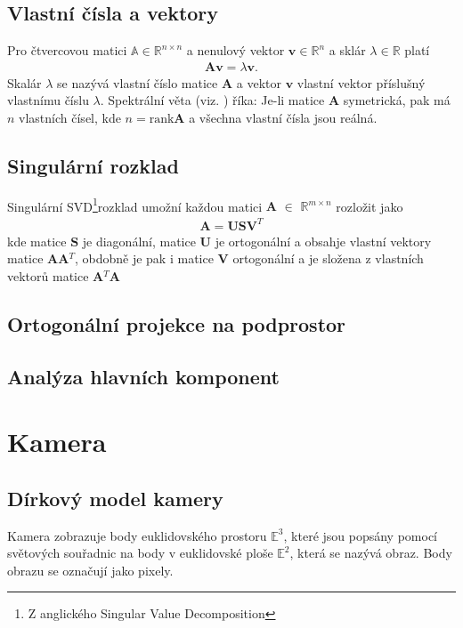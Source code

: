 \documentclass[twoside]{ctuthesis}
\newcommand{\spc}[2]{$\mathbb{#1}^{#2}$}
\newcommand{\minsp}[3]{$\mathbb{#1} \in \mathbb{#2}^{#3}$}
\newcommand{\tl}[1]{$\mathbf{#1}$}
\begin{document}
\section{Vlastní čísla a vektory}
Pro čtvercovou matici \minsp{A}{R}{n\times n} a nenulový vektor \tl{v}\minsp{}{R}{n} a sklár $\lambda \in \mathbb{R}$ platí
\begin{align}
    \mathbf{Av} = \lambda \mathbf{v}.
\end{align}
Skalár $\lambda$ se nazývá vlastní číslo matice \tl{A} a vektor \tl{v} vlastní vektor příslušný vlastnímu číslu $\lambda$.
Spektrální věta (viz. \cite{Werner2020}) říka: Je-li matice \tl{A} symetrická, pak má $n$ vlastních čísel, kde $n = \text{rank}\mathbf{A}$ a všechna vlastní čísla jsou reálná.


\section{Singulární rozklad}
Singulární SVD\footnote{Z anglického Singular Value Decomposition}rozklad umožní každou matici \tl{A} $\in$ \spc{R}{m \times n} rozložit jako
\begin{align}
    \mathbf{A} = \mathbf{USV}^T
\end{align}
kde matice \tl{S} je diagonální, matice \tl{U} je ortogonální a obsahje vlastní vektory matice \tl{AA}$^T$, obdobně je pak i matice \tl{V} ortogonální a je složena z vlastních vektorů matice \tl{A}$^T$\tl{A}

\section{Ortogonální projekce na podprostor}
\label{sec:projekce}

\section{Analýza hlavních komponent}


\chapter{Kamera}

\section{Dírkový model kamery}
Kamera zobrazuje body euklidovského prostoru $\mathbb{E}^3$, které jsou popsány pomocí světových souřadnic na body v euklidovské ploše $\mathbb{E}^2$, která se nazývá obraz. Body obrazu se označují jako pixely. 
\end{document}
